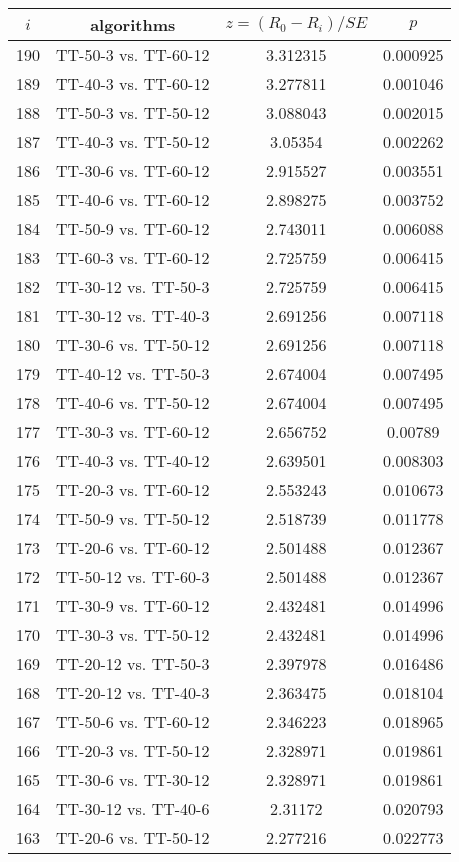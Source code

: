 \documentclass[a4paper,10pt]{article}
\begin{document}
\begin{landscape}
\begin{table}[!htp]
\centering\scriptsize
\begin{tabular}{cccc}
$i$&algorithms&$z=(R_0 - R_i)/SE$&$p$\\
\hline190&TT-50-3 vs. TT-60-12&3.312315&0.000925\\
189&TT-40-3 vs. TT-60-12&3.277811&0.001046\\
188&TT-50-3 vs. TT-50-12&3.088043&0.002015\\
187&TT-40-3 vs. TT-50-12&3.05354&0.002262\\
186&TT-30-6 vs. TT-60-12&2.915527&0.003551\\
185&TT-40-6 vs. TT-60-12&2.898275&0.003752\\
184&TT-50-9 vs. TT-60-12&2.743011&0.006088\\
183&TT-60-3 vs. TT-60-12&2.725759&0.006415\\
182&TT-30-12 vs. TT-50-3&2.725759&0.006415\\
181&TT-30-12 vs. TT-40-3&2.691256&0.007118\\
180&TT-30-6 vs. TT-50-12&2.691256&0.007118\\
179&TT-40-12 vs. TT-50-3&2.674004&0.007495\\
178&TT-40-6 vs. TT-50-12&2.674004&0.007495\\
177&TT-30-3 vs. TT-60-12&2.656752&0.00789\\
176&TT-40-3 vs. TT-40-12&2.639501&0.008303\\
175&TT-20-3 vs. TT-60-12&2.553243&0.010673\\
174&TT-50-9 vs. TT-50-12&2.518739&0.011778\\
173&TT-20-6 vs. TT-60-12&2.501488&0.012367\\
172&TT-50-12 vs. TT-60-3&2.501488&0.012367\\
171&TT-30-9 vs. TT-60-12&2.432481&0.014996\\
170&TT-30-3 vs. TT-50-12&2.432481&0.014996\\
169&TT-20-12 vs. TT-50-3&2.397978&0.016486\\
168&TT-20-12 vs. TT-40-3&2.363475&0.018104\\
167&TT-50-6 vs. TT-60-12&2.346223&0.018965\\
166&TT-20-3 vs. TT-50-12&2.328971&0.019861\\
165&TT-30-6 vs. TT-30-12&2.328971&0.019861\\
164&TT-30-12 vs. TT-40-6&2.31172&0.020793\\
163&TT-20-6 vs. TT-50-12&2.277216&0.022773\\

\end{tabular}
\end{table}
\end{landscape}
\end{document}

